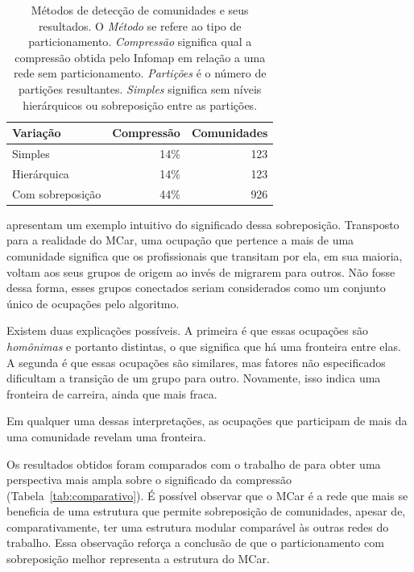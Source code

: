 \documentclass[
  article,
  11pt,
  a4paper,
  english,
  brazil,
  sumario=tradicional]{abntex2}
\begin{document}
\begin{table}
  \centering
  \begin{tabular}{@{} l r r @{}}
    \toprule
    Variação         & Compressão & Comunidades  \\
    \midrule
    Simples          & 14\%       & 123     \\
    Hierárquica      & 14\%       & 123     \\
    Com sobreposição & 44\%       & 926     \\
    \bottomrule
  \end{tabular}
  \caption{Métodos de detecção de comunidades e seus resultados. O \textit{Método} se refere ao tipo de particionamento. \textit{Compressão} significa qual a compressão obtida pelo Infomap em relação a uma rede sem particionamento. \textit{Partições} é o número de partições resultantes. \textit{Simples} significa sem níveis hierárquicos ou sobreposição entre as partições.}
  \label{tab:metodos}
\end{table}

 apresentam um exemplo intuitivo do significado dessa sobreposição. Transposto para a realidade do MCar, uma ocupação que pertence a mais de uma comunidade significa que os profissionais que transitam por ela, em sua maioria, voltam aos seus grupos de origem ao invés de migrarem para outros. Não fosse dessa forma, esses grupos conectados seriam considerados como um conjunto único de ocupações pelo algoritmo.

Existem duas explicações possíveis. A primeira é que essas ocupações são \textit{homônimas} e portanto distintas, o que significa que há uma fronteira entre elas. A segunda é que essas ocupações são similares, mas fatores não especificados dificultam a transição de um grupo para outro. Novamente, isso indica uma fronteira de carreira, ainda que mais fraca.

Em qualquer uma dessas interpretações, as ocupações que participam de mais da uma comunidade revelam uma fronteira.

Os resultados obtidos foram comparados com o trabalho de  para obter uma perspectiva mais ampla sobre o significado da compressão (Tabela~\ref{tab:comparativo}). É possível observar que o MCar é a rede que mais se beneficia de uma estrutura que permite sobreposição de comunidades, apesar de, comparativamente, ter uma estrutura modular comparável às outras redes do trabalho. Essa observação reforça a conclusão de que o particionamento com sobreposição melhor representa a estrutura do MCar.
\end{document}
